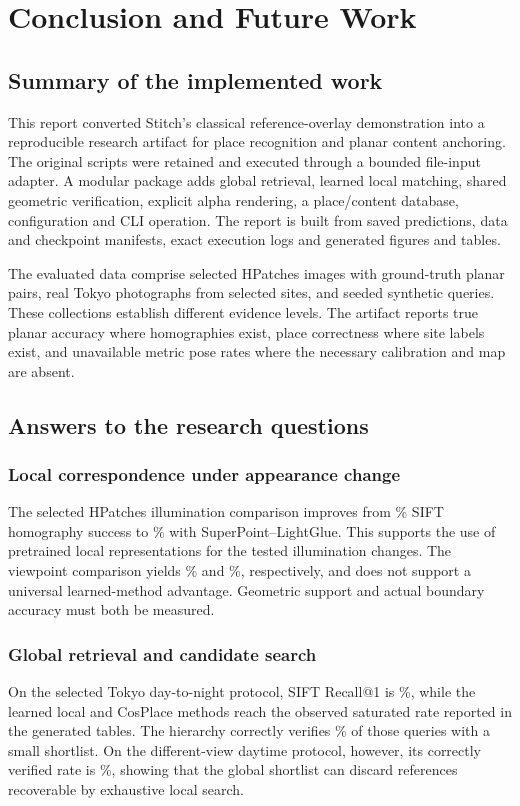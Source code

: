 \chapter{Conclusion and Future Work}\label{ch:conclusion}
\section{Summary of the implemented work}
This report converted Stitch's classical reference-overlay demonstration into a reproducible research artifact for place recognition and planar content anchoring. The original scripts were retained and executed through a bounded file-input adapter. A modular package adds global retrieval, learned local matching, shared geometric verification, explicit alpha rendering, a place/content database, configuration and CLI operation. The report is built from saved predictions, data and checkpoint manifests, exact execution logs and generated figures and tables.

The evaluated data comprise \HpImages{} selected HPatches images with \HpPairs{} ground-truth planar pairs, \TokyoImages{} real Tokyo photographs from \TokyoSites{} selected sites, and \SyntheticQueries{} seeded synthetic queries. These collections establish different evidence levels. The artifact reports true planar accuracy where homographies exist, place correctness where site labels exist, and unavailable metric pose rates where the necessary calibration and map are absent.

\section{Answers to the research questions}
\subsection{Local correspondence under appearance change}
The selected HPatches illumination comparison improves from \HpIllumSift\% SIFT homography success to \HpIllumLearned\% with SuperPoint--LightGlue. This supports the use of pretrained local representations for the tested illumination changes. The viewpoint comparison yields \HpViewSift\% and \HpViewLearned\%, respectively, and does not support a universal learned-method advantage. Geometric support and actual boundary accuracy must both be measured.

\subsection{Global retrieval and candidate search}
On the selected Tokyo day-to-night protocol, SIFT Recall@1 is \DayNightSiftRecall\%, while the learned local and CosPlace methods reach the observed saturated rate reported in the generated tables. The hierarchy correctly verifies \DayNightFullVerified\% of those queries with a small shortlist. On the different-view daytime protocol, however, its correctly verified rate is \DayViewFullVerified\%, showing that the global shortlist can discard references recoverable by exhaustive local search.

